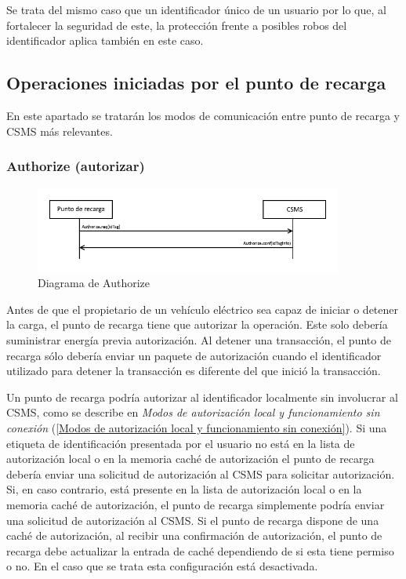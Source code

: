 \documentclass[12pt,a4paper,onecolumn,oneside]{report}
\begin{document}
Se trata del mismo caso que un identificador único de un usuario por lo que, al fortalecer la seguridad de este, la protección frente a posibles robos del identificador aplica también en este caso.



\subsection{Operaciones iniciadas por el punto de recarga}
\label{Operaciones iniciadas por el punto de recarga}

En este apartado se tratarán los modos de comunicación entre punto de recarga y CSMS más relevantes.

\subsubsection{Authorize (autorizar)}
\label{Authorize (Autorizar)}


\begin{figure}[h] 
\centering
  \includegraphics[width=0.9\textwidth]{figuras/diagramaauthorize.png}
  \caption[Diagrama de \textit{Authorize}]{Diagrama de Authorize\\
  }
  \label{fig:diagramaauthorize}
\end{figure}


Antes de que el propietario de un vehículo eléctrico sea capaz de iniciar o detener la carga, el punto de recarga tiene que autorizar la operación. Este solo debería suministrar energía previa autorización. Al detener una transacción, el punto de recarga sólo debería enviar un paquete de autorización cuando el identificador utilizado para detener la transacción es diferente del que inició la transacción.

Un punto de recarga podría autorizar al identificador localmente sin involucrar al CSMS, como se describe en \textit{Modos de autorización local y funcionamiento sin conexión} (\ref{Modos de autorización local y funcionamiento sin conexión}). Si una etiqueta de identificación presentada por el usuario no está en la lista de autorización local o en la memoria caché de autorización el punto de recarga debería enviar una solicitud de autorización al CSMS para solicitar autorización. Si, en caso contrario, está presente en la lista de autorización local o en la memoria caché de autorización, el punto de recarga simplemente podría enviar una solicitud de autorización al CSMS. Si el punto de recarga dispone de una caché de autorización, al recibir una confirmación de autorización, el punto de recarga debe actualizar la entrada de caché dependiendo de si esta tiene permiso o no. En el caso que se trata esta configuración está desactivada.
\end{document}
